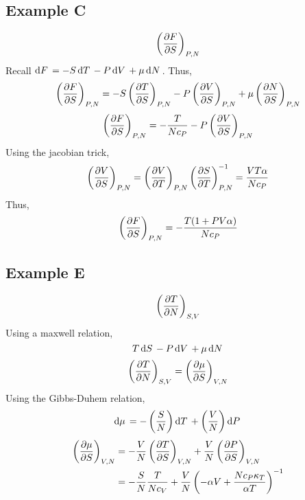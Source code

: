 \subsection{Example C}
\[\left(\frac{\partial F}{\partial S}\right)_{P,N}\]
Recall \(\d{F}=-S\d{T}-P\d{V}+\mu\d{N}\). Thus,
\[\left(\frac{\partial F}{\partial S}\right)_{P,N}=-S\left(\frac{\partial T}{\partial S}\right)_{P,N}-P\left(\frac{\partial V}{\partial S}\right)_{P,N}+\mu\left(\frac{\partial N}{\partial S}\right)_{P,N}\]
\[\left(\frac{\partial F}{\partial S}\right)_{P,N}=-\frac{T}{Nc_P}-P\left(\frac{\partial V}{\partial S}\right)_{P,N}\]
Using the jacobian trick,
\[\left(\frac{\partial V}{\partial S}\right)_{P,N}=\left(\frac{\partial V}{\partial T}\right)_{P,N}\left(\frac{\partial S}{\partial T}\right)^{-1}_{P,N}=\frac{VT\alpha}{Nc_P}\]
Thus,
\[\left(\frac{\partial F}{\partial S}\right)_{P,N}=-\frac{T(1+PV\alpha)}{Nc_P}\]

\subsection{Example E}
\[\left(\frac{\partial T}{\partial N}\right)_{S,V}\]
Using a maxwell relation,
\[T\d{S}-P\d{V}+\mu\d{N}\]
\[\left(\frac{\partial T}{\partial N}\right)_{S,V}=\left(\frac{\partial \mu}{\partial S}\right)_{V,N}\]
Using the Gibbs-Duhem relation,
\[\d\mu = -\left(\frac{S}{N}\right)\d{T}+\left(\frac{V}{N}\right)\d{P}\]
\begin{align*}
	\left(\frac{\partial \mu}{\partial S}\right)_{V,N}&=-\frac{V}{N}\left(\frac{\partial T}{\partial S}\right)_{V,N}+\frac{V}{N}\left(\frac{\partial P}{\partial S}\right)_{V,N}\\
&=-\frac{S}{N}\frac{T}{Nc_V}+\frac{V}{N}\left(-\alpha V + \frac{Nc_P\kappa_T}{\alpha T}\right)^{-1}
\end{align*}

